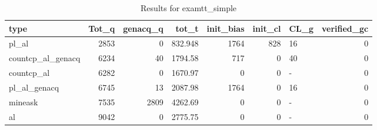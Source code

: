 \begin{table}[ht]
\caption{Results for examtt_simple}
\begin{tabular}{lrrrrrlr}
\hline
 type              &   Tot\_q &   genacq\_q &    tot\_t &   init\_bias &   init\_cl & CL\_g   &   verified\_gc \\
\hline
 pl\_al             &    2853 &          0 &  832.948 &        1764 &       828 & 16     &             0 \\
 countcp\_al\_genacq &    6234 &         40 & 1794.58  &         717 &         0 & 40     &             0 \\
 countcp\_al        &    6282 &          0 & 1670.97  &           0 &         0 & -      &             0 \\
 pl\_al\_genacq      &    6745 &         13 & 2087.98  &        1764 &         0 & 16     &             0 \\
 mineask           &    7535 &       2809 & 4262.69  &           0 &         0 & -      &             0 \\
 al                &    9042 &          0 & 2775.75  &           0 &         0 & -      &             0 \\
\hline
\end{tabular}
\end{table}